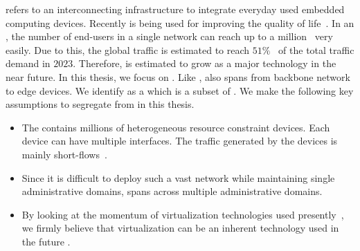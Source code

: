  refers to an interconnecting infrastructure to integrate everyday used embedded computing devices. Recently  is being used for improving the quality of life~\cite{NOUR201995}. In an , the number of end-users in a single network can reach up to a million~\cite{iotdeployment} very easily.  Due to this, the global  traffic is estimated to reach $51\%$~\cite{ipassonline} of the total traffic demand in $2023$. Therefore,  is estimated to grow as a major technology in the near future. In this thesis, we focus on . Like ,  also spans from backbone network to edge devices. We identify  as a  which is a subset of . We make the following key assumptions to segregate  from  in this thesis.
\begin{itemize}
\item The  contains millions of heterogeneous resource constraint  devices. Each device can have multiple interfaces. The traffic generated by the  devices is mainly short-flows~\cite{6560419}.
\item Since it is difficult to deploy such a vast network while maintaining single administrative domains,  spans across multiple administrative domains.
\item By looking at the momentum of virtualization technologies used presently~\cite{10.1145/3341302.3342075}, we firmly believe that virtualization can be an inherent technology used in the future .
\end{itemize}